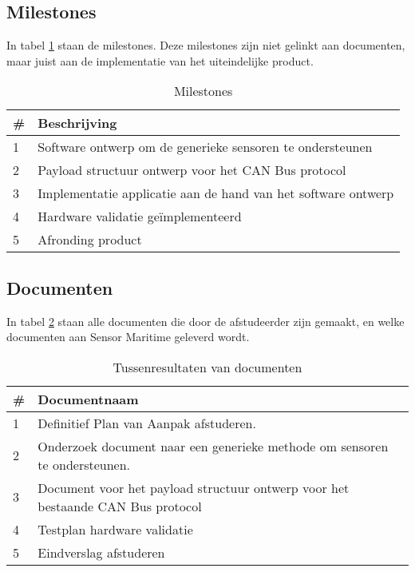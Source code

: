 \subsection{Milestones}
In tabel \ref{tab:milestones} staan de milestones. Deze milestones zijn niet gelinkt aan documenten, maar juist aan de implementatie van het uiteindelijke product.
\begin{table}[h!]
		\caption{Milestones}
		\begin{tabular}{p{1cm}p{14cm}}
		\toprule
		\textbf{\#} & \textbf{Beschrijving} \\ \midrule
		1 & Software ontwerp om de generieke sensoren te ondersteunen      \\
		2 & Payload structuur ontwerp voor het CAN Bus protocol      \\
		3 & Implementatie applicatie aan de hand van het software ontwerp					\\
		4 & Hardware validatie geïmplementeerd		\\
		5 & Afronding product  \\ \bottomrule
		\end{tabular}

	\label{tab:milestones}
\end{table}

\subsection{Documenten}
In tabel \ref{tab:documents} staan  alle documenten die door de afstudeerder zijn gemaakt, en welke documenten aan Sensor Maritime geleverd wordt.
\begin{table}[h!] 
	\caption{Tussenresultaten van documenten}
	\begin{tabular}{p{1cm}p{14cm}}
	\toprule
	\textbf{\#} & \textbf{Documentnaam}   \\ \midrule
	1 & Definitief Plan van Aanpak afstuderen. \\
	2 & Onderzoek document naar een generieke methode om sensoren te ondersteunen. \\
	3 & Document voor het payload structuur ontwerp voor het bestaande CAN Bus protocol \\
	4 & Testplan hardware validatie \\
	5 & Eindverslag afstuderen \\ \bottomrule
	\end{tabular}

\label{tab:documents}
\end{table}

